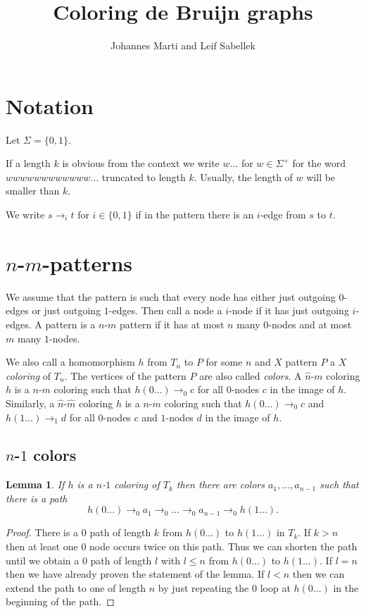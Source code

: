 \documentclass[a4paper]{article}
\title{Coloring de Bruijn graphs}
\author{Johannes Marti and Leif Sabellek}
\newtheorem{lemma}[theorem]{Lemma}
\begin{document}
\maketitle

\section{Notation}

Let $\Sigma = \{0,1\}$.

If a length $k$ is obvious from the context we write $w\dots$ for $w \in
\Sigma^+$ for the word $w w w w w w w w w w w w \dots$ truncated to
length $k$. Usually, the length of $w$ will be smaller than $k$.

We write $s \rightarrow_i t$ for $i \in \{0,1\}$ if in the pattern there
is an $i$-edge from $s$ to $t$.


\section{$n$-$m$-patterns}

We assume that the pattern is such that every node has either just
outgoing $0$-edges or just outgoing $1$-edges. Then call a node a
$i$-node if it has just outgoing $i$-edges. A pattern is a $n$-$m$
pattern if it has at most $n$ many $0$-nodes and at most $m$ many
$1$-nodes. 

We also call a homomorphism $h$ from $T_n$ to $P$ for some $n$ and $X$
pattern $P$ a \emph{$X$ coloring} of $T_n$. The vertices of the pattern
$P$ are also called \emph{colors}. A $\hat{n}$-$m$ coloring $h$ is a
$n$-$m$ coloring such that $h(0\dots) \rightarrow_0 c$ for all $0$-nodes
$c$ in the image of $h$. Similarly, a $\hat{n}$-$\hat{m}$ coloring $h$
is a $n$-$m$ coloring such that $h(0\dots) \rightarrow_0 c$ and
$h(1\dots) \rightarrow_1 d$ for all $0$-nodes $c$ and $1$-nodes $d$ in
the image of $h$.

\subsection{$n$-$1$ colors}

\begin{lemma} \label{l:path to other loop}
 If $h$ is a $n$-$1$ coloring of $T_k$ then there are colors
$a_1,\dots,a_{n - 1}$ such that there is a path
\[
 h(0\dots) \rightarrow_0 a_1 \rightarrow_0 \dots \rightarrow_0 a_{n - 1}
\rightarrow_0 h(1\dots).
\]
\end{lemma}
\begin{proof}
 There is a $0$ path of length $k$ from $h(0\dots)$ to $h(1\dots)$ in
$T_k$. If $k > n$ then at least one $0$ node occurs twice on this path.
Thus we can shorten the path until we obtain a $0$ path of length $l$
with $l \leq n$ from $h(0\dots)$ to $h(1\dots)$. If $l = n$ then we have
already proven the statement of the lemma. If $l < n$ then we can extend
the path to one of length $n$ by just repeating the $0$ loop at
$h(0\dots)$ in the beginning of the path.
\end{proof}
\end{document}
